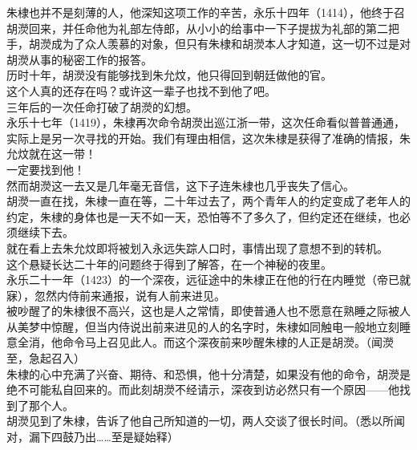 \begin{multicols}{\theparacolNo}
朱棣也并不是刻薄的人，他深知这项工作的辛苦，永乐十四年（1414），他终于召胡濙回来，并任命他为礼部左侍郎，从小小的给事中一下子提拔为礼部的第二把手，胡濙成为了众人羡慕的对象，但只有朱棣和胡濙本人才知道，这一切不过是对胡濙从事的秘密工作的报答。\\

历时十年，胡濙没有能够找到朱允炆，他只得回到朝廷做他的官。\\

这个人真的还存在吗？或许这一辈子也找不到他了吧。\\

三年后的一次任命打破了胡濙的幻想。\\

永乐十七年（1419），朱棣再次命令胡濙出巡江浙一带，这次任命看似普普通通，实际上是另一次寻找的开始。我们有理由相信，这次朱棣是获得了准确的情报，朱允炆就在这一带！\\

一定要找到他！\\

然而胡濙这一去又是几年毫无音信，这下子连朱棣也几乎丧失了信心。\\

胡濙一直在找，朱棣一直在等，二十年过去了，两个青年人的约定变成了老年人的约定，朱棣的身体也是一天不如一天，恐怕等不了多久了，但约定还在继续，也必须继续下去。\\

就在看上去朱允炆即将被划入永远失踪人口时，事情出现了意想不到的转机。\\

这个悬疑长达二十年的问题终于得到了解答，在一个神秘的夜里。\\

永乐二十一年（1423）的一个深夜，远征途中的朱棣正在他的行在内睡觉（帝已就寐），忽然内侍前来通报，说有人前来进见。\\

被吵醒了的朱棣很不高兴，这也是人之常情，即使普通人也不愿意在熟睡之际被人从美梦中惊醒，但当内侍说出前来进见的人的名字时，朱棣如同触电一般地立刻睡意全消，他命令马上召见此人。而这个深夜前来吵醒朱棣的人正是胡濙。（闻濙至，急起召入）\\

朱棣的心中充满了兴奋、期待、和恐惧，他十分清楚，如果没有他的命令，胡濙是绝不可能私自回来的。而此刻胡濙不经请示，深夜到访必然只有一个原因——他找到了那个人。\\

胡濙见到了朱棣，告诉了他自己所知道的一切，两人交谈了很长时间。（悉以所闻对，漏下四鼓乃出……至是疑始释）\\


\end{multicols}
